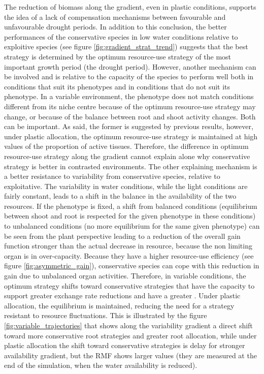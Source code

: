 The reduction of biomass along the gradient, even in plastic conditions, supports the idea of a lack of compensation mechanisms between favourable and unfavourable drought periods. In addition to this conclusion, the better performances of the conservative species in low water conditions relative to exploitive species (see figure \ref{fig:gradient_strat_trend}) suggests that the best strategy is determined by the optimum resource-use strategy of the most important growth period (the drought period). However, another mechanism can be involved and is relative to the capacity of the species to perform well both in conditions that suit its phenotypes and in conditions that do not suit its phenotype. In a variable environment, the phenotype does not match conditions different from its niche centre because of the optimum resource-use strategy may change, or because of the balance between root and shoot activity changes. Both can be important. As said, the former is suggested by previous results, however, under plastic allocation, the optimum resource-use strategy is maintained at high values of the proportion of active tissues. Therefore, the difference in optimum resource-use strategy along the gradient cannot explain alone why conservative strategy is better in contrasted environments. The other explaining mechanism is a better resistance to variability from conservative species, relative to exploitative. The variability in water conditions, while the light conditions are fairly constant, leads to a shift in the balance in the availability of the two resources. If the phenotype is fixed, a shift from balanced conditions (equilibrium between shoot and root is respected for the given phenotype in these conditions) to unbalanced conditions (no more equilibrium for the same given phenotype) can be seen from the plant perspective leading to a reduction of the overall gain function stronger than the actual decrease in resource, because the non limiting organ is in over-capacity. Because they have a higher resource-use efficiency (see figure \ref{fig:asymmetric_gain}), conservative species can cope with this reduction in gain due to unbalanced organ activities. Therefore, in variable conditions, the optimum strategy shifts toward conservative strategies that have the capacity to support greater exchange rate reductions and have a greater . Under plastic allocation, the equilibrium is maintained, reducing the need for a strategy resistant to resource fluctuations. This is illustrated by the figure \ref{fig:variable_trajectories} that shows along the variability gradient a direct shift toward more conservative root strategies and greater root allocation, while under plastic allocation the shift toward conservative strategies is delay for stronger availability gradient, but the RMF shows larger values (they are measured at the end of the simulation, when the water availability is reduced).

